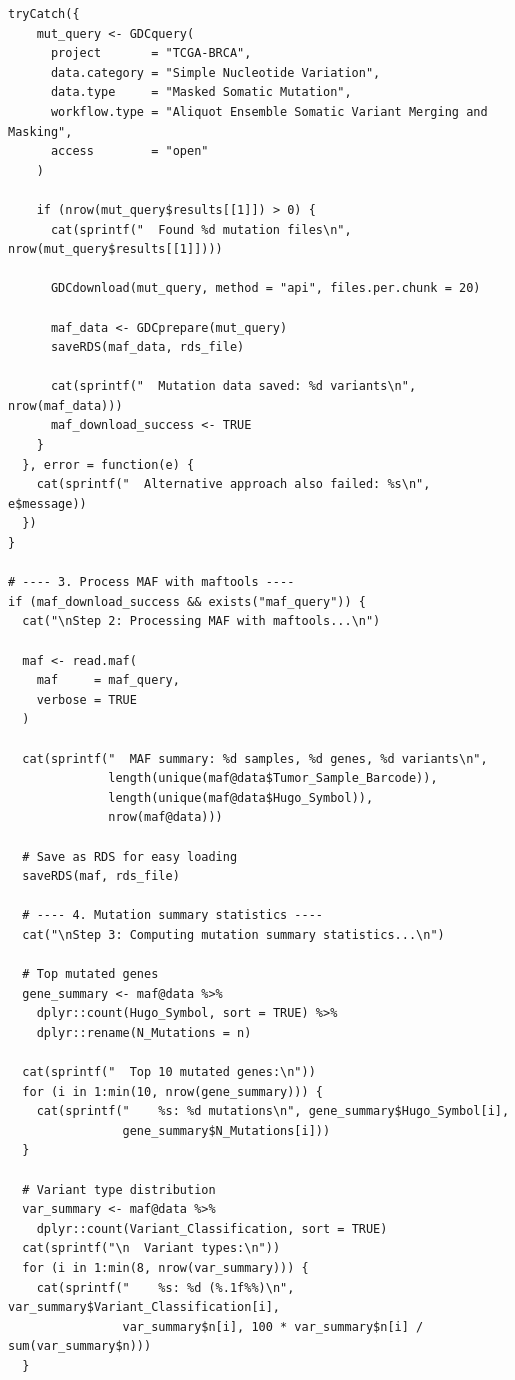 \documentclass[12pt,a4paper]{ctexart}
\begin{document}
\begin{lstlisting}[caption={02_download_mutations}, basicstyle=\ttfamily\scriptsize]
  tryCatch({
    mut_query <- GDCquery(
      project       = "TCGA-BRCA",
      data.category = "Simple Nucleotide Variation",
      data.type     = "Masked Somatic Mutation",
      workflow.type = "Aliquot Ensemble Somatic Variant Merging and Masking",
      access        = "open"
    )

    if (nrow(mut_query$results[[1]]) > 0) {
      cat(sprintf("  Found %d mutation files\n", nrow(mut_query$results[[1]])))

      GDCdownload(mut_query, method = "api", files.per.chunk = 20)

      maf_data <- GDCprepare(mut_query)
      saveRDS(maf_data, rds_file)

      cat(sprintf("  Mutation data saved: %d variants\n", nrow(maf_data)))
      maf_download_success <- TRUE
    }
  }, error = function(e) {
    cat(sprintf("  Alternative approach also failed: %s\n", e$message))
  })
}

# ---- 3. Process MAF with maftools ----
if (maf_download_success && exists("maf_query")) {
  cat("\nStep 2: Processing MAF with maftools...\n")

  maf <- read.maf(
    maf     = maf_query,
    verbose = TRUE
  )

  cat(sprintf("  MAF summary: %d samples, %d genes, %d variants\n",
              length(unique(maf@data$Tumor_Sample_Barcode)),
              length(unique(maf@data$Hugo_Symbol)),
              nrow(maf@data)))

  # Save as RDS for easy loading
  saveRDS(maf, rds_file)

  # ---- 4. Mutation summary statistics ----
  cat("\nStep 3: Computing mutation summary statistics...\n")

  # Top mutated genes
  gene_summary <- maf@data %>%
    dplyr::count(Hugo_Symbol, sort = TRUE) %>%
    dplyr::rename(N_Mutations = n)

  cat(sprintf("  Top 10 mutated genes:\n"))
  for (i in 1:min(10, nrow(gene_summary))) {
    cat(sprintf("    %s: %d mutations\n", gene_summary$Hugo_Symbol[i],
                gene_summary$N_Mutations[i]))
  }

  # Variant type distribution
  var_summary <- maf@data %>%
    dplyr::count(Variant_Classification, sort = TRUE)
  cat(sprintf("\n  Variant types:\n"))
  for (i in 1:min(8, nrow(var_summary))) {
    cat(sprintf("    %s: %d (%.1f%%)\n", var_summary$Variant_Classification[i],
                var_summary$n[i], 100 * var_summary$n[i] / sum(var_summary$n)))
  }


\end{lstlisting}
\end{document}
